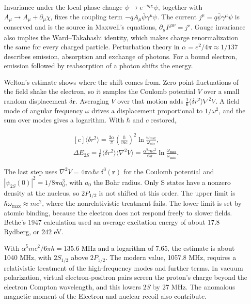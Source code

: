 \documentclass[11pt,oneside]{book}
\newenvironment{centeredalign}{\[\begin{gathered}[c]}{\end{gathered}\]}
\begin{document}
Invariance under the local phase change \(\psi\to e^{-iq\chi}\psi\), together with \(A_\mu\to A_\mu+\partial_\mu\chi\), fixes the coupling term \(-qA_\mu\bar\psi\gamma^\mu\psi\). The current \(j^\mu=q\bar\psi\gamma^\mu\psi\) is conserved and is the source in Maxwell's equations, \(\partial_\mu F^{\mu\nu}=j^\nu\). Gauge invariance also implies the Ward--Takahashi identity, which makes charge renormalization the same for every charged particle. Perturbation theory in \(\alpha=e^2/4\pi\approx1/137\) describes emission, absorption and exchange of photons. For a bound electron, emission followed by reabsorption of a photon shifts the energy.

Welton's estimate shows where the shift comes from. Zero-point fluctuations of the field shake the electron, so it samples the Coulomb potential \(V\) over a small random displacement \(\delta\mathbf r\). Averaging \(V\) over that motion adds \(\frac16\langle\delta r^2\rangle\nabla^2V\). A field mode of angular frequency \(\omega\) drives a displacement proportional to \(1/\omega^2\), and the sum over modes gives a logarithm. With \(\hbar\) and \(c\) restored,

\begin{centeredalign}
\langle\delta r^2\rangle=\frac{2\alpha}{\pi}\left(\frac{\hbar}{mc}\right)^2
\ln\frac{\omega_{\max}}{\omega_{\min}},\\
\Delta E_{2S}=\frac16\langle\delta r^2\rangle\langle\nabla^2V\rangle
=\frac{\alpha^5mc^2}{6\pi}\ln\frac{\omega_{\max}}{\omega_{\min}}.
\end{centeredalign}

The last step uses \(\nabla^2V=4\pi\alpha\hbar c\,\delta^3(\mathbf r)\) for the Coulomb potential and \(|\psi_{2S}(0)|^2=1/8\pi a_0^3\), with \(a_0\) the Bohr radius. Only S states have a nonzero density at the nucleus, so \(2P_{1/2}\) is not shifted at this order. The upper limit is \(\hbar\omega_{\max}\approx mc^2\), where the nonrelativistic treatment fails. The lower limit is set by atomic binding, because the electron does not respond freely to slower fields. Bethe's 1947 calculation used an average excitation energy of about 17.8 Rydberg, or 242 eV.

With \(\alpha^5mc^2/6\pi h=135.6\) MHz and a logarithm of 7.65, the estimate is about 1040 MHz, with \(2S_{1/2}\) above \(2P_{1/2}\). The modern value, 1057.8 MHz, requires a relativistic treatment of the high-frequency modes and further terms. In vacuum polarization, virtual electron-positron pairs screen the proton's charge beyond the electron Compton wavelength, and this lowers \(2S\) by 27 MHz. The anomalous magnetic moment of the Electron and nuclear recoil also contribute.
\end{document}
